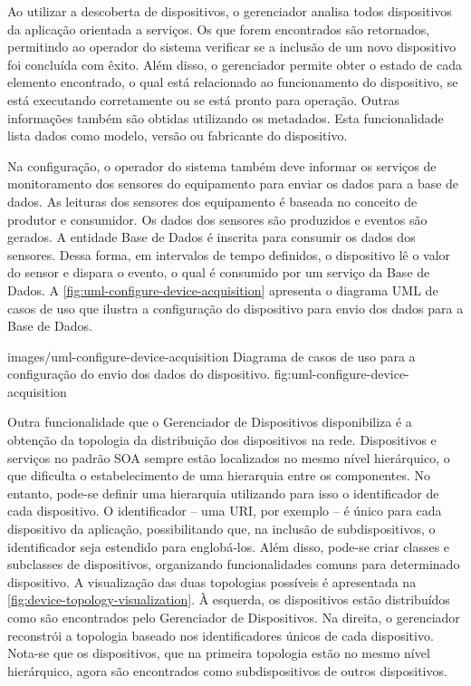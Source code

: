 Ao utilizar a descoberta de dispositivos, o gerenciador analisa todos dispositivos da aplicação
orientada a serviços. Os que forem encontrados são retornados, permitindo ao operador do sistema
verificar se a inclusão de um novo dispositivo foi concluída com êxito. Além disso, o gerenciador
permite obter o estado de cada elemento encontrado, o qual está relacionado ao funcionamento do
dispositivo, se está executando corretamente ou se está pronto para operação. Outras informações
também são obtidas utilizando os metadados. Esta funcionalidade lista dados como modelo, versão ou
fabricante do dispositivo.

Na configuração, o operador do sistema também deve informar os serviços de monitoramento dos
sensores do equipamento para enviar os dados para a base de dados. As leituras dos sensores dos
equipamento é baseada no conceito de produtor e consumidor. Os dados dos sensores são produzidos e
eventos são gerados. A entidade Base de Dados é inscrita para consumir os dados dos sensores. Dessa
forma, em intervalos de tempo definidos, o dispositivo lê o valor do sensor e dispara o evento, o
qual é consumido por um serviço da Base de Dados. A \cref{fig:uml-configure-device-acquisition}
apresenta o diagrama \gls{UML} de casos de uso que ilustra a configuração do dispositivo para envio
dos dados para a Base de Dados.

  {images/uml-configure-device-acquisition}
  {Diagrama de casos de uso para a configuração do envio dos dados do dispositivo.}
  {fig:uml-configure-device-acquisition}

Outra funcionalidade que o Gerenciador de Dispositivos disponibiliza é a obtenção da topologia da
distribuição dos dispositivos na rede. Dispositivos e serviços no padrão \gls{SOA} sempre estão
localizados no mesmo nível hierárquico, o que dificulta o estabelecimento de uma hierarquia entre os
componentes. No entanto, pode-se definir uma hierarquia utilizando para isso o identificador de cada
dispositivo. O identificador -- uma \gls{URI}, por exemplo -- é único para cada dispositivo da
aplicação, possibilitando que, na inclusão de subdispositivos, o identificador seja estendido para
englobá-los. Além disso, pode-se criar classes e subclasses de dispositivos, organizando
funcionalidades comuns para determinado dispositivo. A visualização das duas topologias possíveis é
apresentada na \cref{fig:device-topology-visualization}. À esquerda, os dispositivos estão
distribuídos como são encontrados pelo Gerenciador de Dispositivos. Na direita, o gerenciador
reconstrói a topologia baseado nos identificadores únicos de cada dispositivo. Nota-se que os
dispositivos, que na primeira topologia estão no mesmo nível hierárquico, agora são encontrados como
subdispositivos de outros dispositivos.

